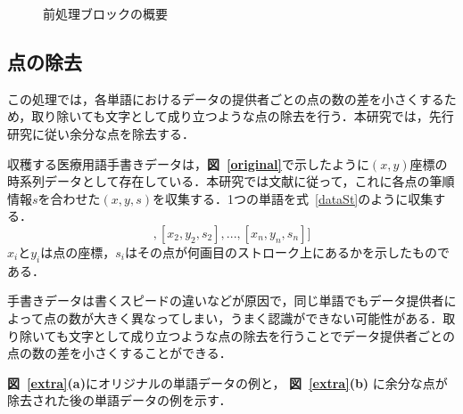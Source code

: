 \begin{figure}[tb]
 \begin{center}
  \caption{前処理ブロックの概要}
  \label{preprocess}
\end{center}
\end{figure}

\subsection{点の除去}
\label{remove_points}
この処理では，各単語におけるデータの提供者ごとの点の数の差を小さくするため，取り除いても文字として成り立つような点の除去を行う．本研究では，先行研究に従い余分な点を除去する．

収穫する医療用語手書きデータは，\textbf{図~\ref{original}}で示したように$(x, y)$座標の時系列データとして存在している．本研究では文献\cite{zhang18:drawing}に従って，これに各点の筆順情報$s$を合わせた$(x, y, s)$を収集する．1つの単語を式~\ref{dataSt}のように収集する．
\begin{equation}
 [[x_1, y_1, s_1], [x_2, y_2, s_2],..., [x_n, y_n, s_n]]
 \label{dataSt}
\end{equation}
$x_i$と$y_i$は点の座標，$s_i$はその点が何画目のストローク上にあるかを示したものである．

手書きデータは書くスピードの違いなどが原因で，同じ単語でもデータ提供者によって点の数が大きく異なってしまい，うまく認識ができない可能性がある．取り除いても文字として成り立つような点の除去を行うことでデータ提供者ごとの点の数の差を小さくすることができる．

\textbf{図~\ref{extra}(a)}にオリジナルの単語データの例と， \textbf{図~\ref{extra}(b)} に余分な点が除去された後の単語データの例を示す．

